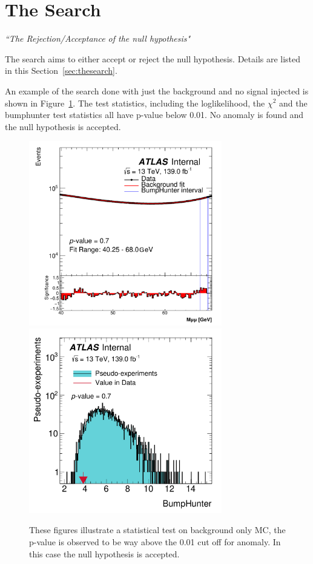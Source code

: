 \section{The Search}

\textit{``The Rejection/Acceptance of the null hypothesis"}

The search aims to either accept or reject the null hypothesis. Details are listed in this Section~\ref{sec:thesearch}.

An example of the search done with just the background and no signal injected is shown in Figure~\ref{}. The test statistics, including 
the loglikelihood, the $\chi^{2}$ and the bumphunter test statistics all have p-value below 0.01. No anomaly is found and the null hypothesis is accepted.
    
\begin{figure}[!htb]
    \begin{center}
        \includegraphics[width=0.75\textwidth]{figures/chapter_dimuon/nominal_fixed}
        \includegraphics[width=0.75\textwidth]{figures/chapter_dimuon/bumpHunterStatPlot}
        \caption{
        These figures illustrate a statistical test on background only MC, the p-value is observed to be way above the 0.01 cut off for anomaly. In  this case the null hypothesis is accepted.
        }
    \label{fig:dimuonstudies}
    \end{center}
\end{figure}

